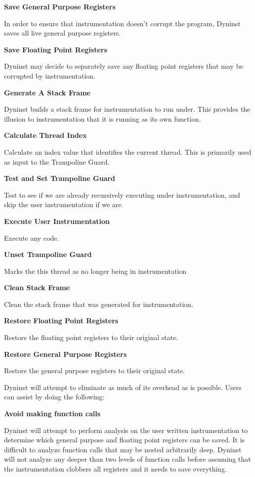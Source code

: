 \setlength{\leftskip}{0.5cm}

  \textbf{Save General Purpose Registers}

  In order to ensure that instrumentation doesn't corrupt the program,
  Dyninst saves all live general purpose registers.

  \textbf{Save Floating Point Registers}

  Dyninst may decide to separately save any floating point registers
  that may be corrupted by instrumentation.

  \textbf{Generate A Stack Frame}

  Dyninst builds a stack frame for instrumentation to run under. This
  provides the illusion to instrumentation that it is running as its own function.

  \textbf{Calculate Thread Index}

  Calculate an index value that identifies the current thread. This is
  primarily used as input to the Trampoline Guard.

  \textbf{Test and Set Trampoline Guard}

  Test to see if we are already recursively executing under
  instrumentation, and skip the user instrumentation if we are.

  \textbf{Execute User Instrumentation}

  Execute any  code.

  \textbf{Unset Trampoline Guard}

  Marks the this thread as no longer being in instrumentation

  \textbf{Clean Stack Frame}

  Clean the stack frame that was generated for instrumentation.

  \textbf{Restore Floating Point Registers}

  Restore the floating point registers to their original state.

  \textbf{Restore General Purpose Registers}

  Restore the general purpose registers to their original state.

\setlength{\leftskip}{0cm}

Dyninst will attempt to eliminate as much of its overhead as is
possible. Users can assist by doing the following:

\setlength{\leftskip}{0.5cm}

  \textbf{Avoid making function calls}

  Dyninst will attempt to perform analysis on the user
  written instrumentation to determine which general purpose and
  floating point registers can be saved. It is difficult
  to analyze function calls that may be nested arbitrarily deep.
  Dyninst will not analyze any deeper than two levels of
  function calls before assuming that the instrumentation clobbers
  all registers and it needs to save everything.

